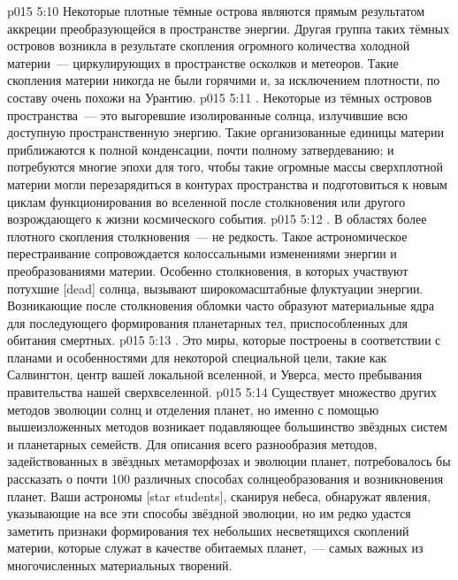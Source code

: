 \vs p015 5:10 Некоторые плотные тёмные острова являются прямым результатом аккреции преобразующейся в пространстве энергии. Другая группа таких тёмных островов возникла в результате скопления огромного количества холодной материи~--- циркулирующих в пространстве осколков и метеоров. Такие скопления материи никогда не были горячими и, за исключением плотности, по составу очень похожи на Урантию.
\vs p015 5:11 . Некоторые из тёмных островов пространства~--- это выгоревшие изолированные солнца, излучившие всю доступную пространственную энергию. Такие организованные единицы материи приближаются к полной конденсации, почти полному затвердеванию; и потребуются многие эпохи для того, чтобы такие огромные массы сверхплотной материи могли перезарядиться в контурах пространства и подготовиться к новым циклам функционирования во вселенной после столкновения или другого возрождающего к жизни космического события.
\vs p015 5:12 . В областях более плотного скопления столкновения~--- не редкость. Такое астрономическое перестраивание сопровождается колоссальными изменениями энергии и преобразованиями материи. Особенно столкновения, в которых участвуют потухшие [dead] солнца, вызывают широкомасштабные флуктуации энергии. Возникающие после столкновения обломки часто образуют материальные ядра для последующего формирования планетарных тел, приспособленных для обитания смертных.
\vs p015 5:13 . Это миры, которые построены в соответствии с планами и особенностями для некоторой специальной цели, такие как Салвингтон, центр вашей локальной вселенной, и Уверса, место пребывания правительства нашей сверхвселенной.
\vs p015 5:14 \pc Существует множество других методов эволюции солнц и отделения планет, но именно с помощью вышеизложенных методов возникает подавляющее большинство звёздных систем и планетарных семейств. Для описания всего разнообразия методов, задействованных в звёздных метаморфозах и эволюции планет, потребовалось бы рассказать о почти 100 различных способах солнцеобразования и возникновения планет. Ваши астрономы [star students], сканируя небеса, обнаружат явления, указывающие на все эти способы звёздной эволюции, но им редко удастся заметить признаки формирования тех небольших несветящихся скоплений материи, которые служат в качестве обитаемых планет,~--- самых важных из многочисленных материальных творений.
